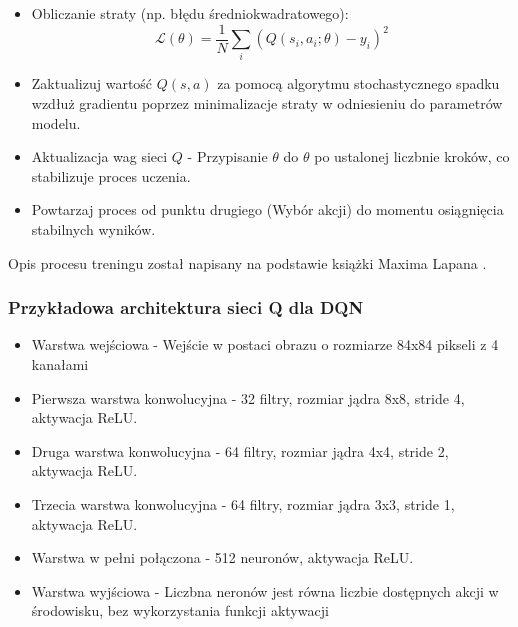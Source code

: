 \documentclass[a4paper, 12pt]{article}
\numberwithin{equation}{section}
\begin{document}
\begin{itemize}
        \item Obliczanie straty (np. błędu średniokwadratowego):
        \begin{equation}
        \mathcal{L}(\theta) = \frac{1}{N} \sum_{i}(Q(s_i,a_i;\theta)-y_i)^2 
        \end{equation}
        \item Zaktualizuj wartość \( Q(s,a) \) za pomocą algorytmu stochastycznego spadku wzdłuż gradientu poprzez minimalizacje straty w odniesieniu do parametrów modelu.
        \item Aktualizacja wag sieci \( Q \) - Przypisanie \( \theta \) do \( \theta \) po ustalonej liczbnie kroków, co stabilizuje proces uczenia.
        \item Powtarzaj proces od punktu drugiego (Wybór akcji) do momentu osiągnięcia stabilnych wyników.
    \end{itemize}
    Opis procesu treningu został napisany na podstawie książki Maxima Lapana \cite{lapan2020deep}.
    \subsubsection{Przykładowa architektura sieci Q dla DQN}
    \begin{itemize}
        \item Warstwa wejściowa - Wejście w postaci obrazu o rozmiarze 84x84 pikseli z 4 kanałami
        \item Pierwsza warstwa konwolucyjna - 32 filtry, rozmiar jądra 8x8, stride 4, aktywacja ReLU.
        \item Druga warstwa konwolucyjna - 64 filtry, rozmiar jądra 4x4, stride 2, aktywacja ReLU.
        \item Trzecia warstwa konwolucyjna - 64 filtry, rozmiar jądra 3x3, stride 1, aktywacja ReLU.
        \item Warstwa w pełni połączona - 512 neuronów, aktywacja ReLU.
        \item Warstwa wyjściowa - Liczbna neronów jest równa liczbie dostępnych akcji w środowisku, bez wykorzystania funkcji aktywacji
    \end{itemize}
\end{document}
